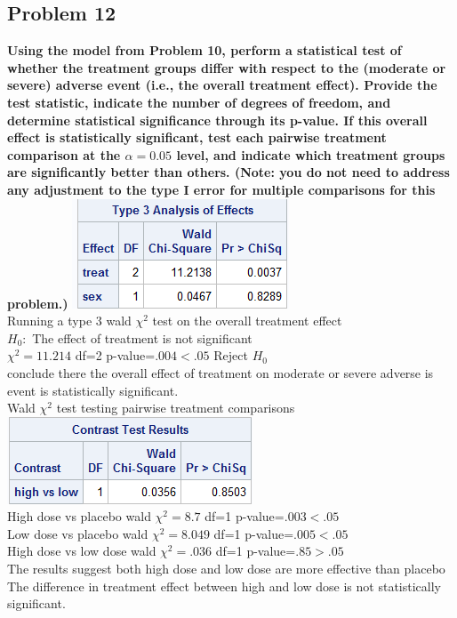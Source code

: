 \documentclass{article}
\begin{document}
\begin{flushleft}
\section*{Problem 12}
\textbf{Using the model from Problem 10, perform a statistical test of whether the treatment groups differ
with respect to the (moderate or severe) adverse event (i.e., the overall treatment effect). Provide the
test statistic, indicate the number of degrees of freedom, and determine statistical significance
through its p-value. If this overall effect is statistically significant, test each pairwise treatment
comparison at the $\alpha=0.05$ level, and indicate which treatment groups are significantly better than
others. (Note: you do not need to address any adjustment to the type I error for multiple comparisons
for this problem.)}\medbreak
\includegraphics[scale=.6]{type3.png}\\
Running a type 3 wald $\chi^2$ test on the overall treatment effect\\
$H_0:$ The effect of treatment is not significant\\
$\chi^2=11.214$ df=2 p-value=$.004<.05$ Reject $H_0$\\
conclude there the overall effect of treatment on moderate or severe adverse is event is statistically significant.\\
Wald $\chi^2$ test testing pairwise treatment comparisons\\
\includegraphics[scale=.6]{highlow.png}\\
High dose vs placebo wald $\chi^2=8.7$ df=1 p-value=$.003<.05$  \\
Low dose vs placebo  wald $\chi^2=8.049$ df=1 p-value=$.005<.05$ \\
High dose vs low dose  wald $\chi^2=.036$ df=1 p-value=$.85>.05$ \\
The results suggest both high dose and low dose are more effective than placebo\\
The difference in treatment effect between high and low dose is not statistically significant.
\pagebreak 

\end{flushleft}
\end{document}

